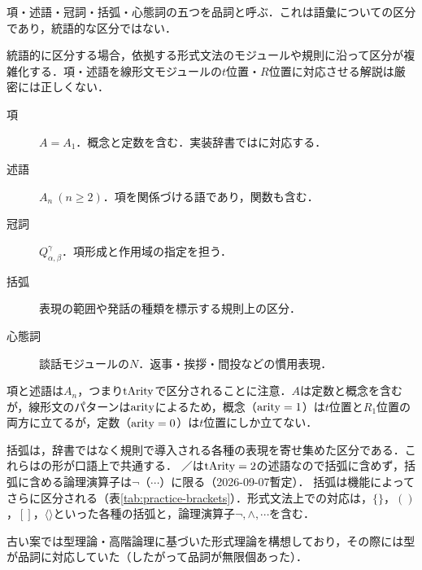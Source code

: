 \documentclass[../../main-detail.tex]{subfiles}
\begin{document}
項・述語・冠詞・括弧・心態詞の五つを品詞と呼ぶ．これは語彙についての区分であり，統語的な区分ではない．
\begin{remark}
    統語的に区分する場合，依拠する形式文法のモジュールや規則に沿って区分が複雑化する．項・述語を線形文モジュールの$t$位置・$R$位置に対応させる解説は厳密には正しくない．
\end{remark}
\begin{description}
 \item[項] $A=A_1$．概念と定数を含む．実装辞書ではに対応する．
 \item[述語] $A_n\ (n\geq2)$．項を関係づける語であり，関数も含む．
 \item[冠詞] $Q^\gamma_{\alpha,\beta}$．項形成と作用域の指定を担う．
 \item[括弧] 表現の範囲や発話の種類を標示する規則上の区分．
 \item[心態詞] 談話モジュールの$N$．返事・挨拶・間投などの慣用表現．
\end{description}
\begin{remark}
    項と述語は$A_n$，つまり$\mathop{\mathrm{tArity}}$で区分されることに注意．$A$は定数と概念を含むが，線形文のパターンは$\mathop{\mathrm{arity}}$によるため，概念（$\mathop{\mathrm{arity}} = 1$）は$t$位置と$R_1$位置の両方に立てるが，定数（$\mathop{\mathrm{arity}} = 0$）は$t$位置にしか立てない．
\end{remark}
\begin{remark}
    括弧は，辞書ではなく規則で導入される各種の表現を寄せ集めた区分である．これらは\ko{[表現1]$\cdots$[表現2]}の形が口語上で共通する．
    ／は$\mathop{\mathrm{tArity}}=2$の述語なので括弧に含めず，括弧に含める論理演算子は$\lnot$（$\cdots$）に限る（2026-09-07暫定）．
    括弧は機能によってさらに区分される（表\ref{tab:practice-brackets}）．形式文法上での対応は，$\{\}$，$()$，$[]$，$\langle\rangle$といった各種の括弧と，論理演算子$\lnot, \land,\cdots$を含む．
\end{remark}
\begin{whynot}
    古い案では型理論・高階論理に基づいた形式理論を構想しており，その際には型が品詞に対応していた（したがって品詞が無限個あった）．
\end{whynot}
\end{document}
